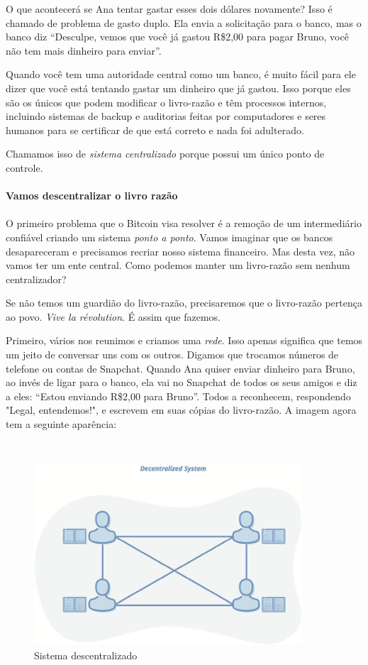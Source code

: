 O que acontecerá se Ana tentar gastar esses dois dólares novamente? Isso é chamado de problema de gasto duplo. Ela envia a solicitação para o banco, mas o banco diz “Desculpe, vemos que você já gastou R\$2,00 para pagar Bruno, você não tem mais dinheiro para enviar”.

Quando você tem uma autoridade central como um banco, é muito fácil para ele dizer que você está tentando gastar um dinheiro que já gastou. Isso porque eles são os únicos que podem modificar o livro-razão e têm processos internos, incluindo sistemas de backup e auditorias feitas por computadores e seres humanos para se certificar de que está correto e nada foi adulterado.

Chamamos isso de \textit{sistema centralizado} porque possui um único ponto de controle.

\paragraph{Vamos descentralizar o livro razão}
\paragraph{}

O primeiro problema que o Bitcoin visa resolver é a remoção de um intermediário confiável criando um sistema \textit{ponto a ponto}. Vamos imaginar que os bancos desapareceram e precisamos recriar nosso sistema financeiro. Mas desta vez, não vamos ter um ente central. Como podemos manter um livro-razão sem nenhum centralizador?

Se não temos um guardião do livro-razão, precisaremos que o livro-razão pertença ao povo. \textit{Vive la révolution}. É assim que fazemos.

Primeiro, vários nos reunimos e criamos uma \textit{rede}. Isso apenas significa que temos um jeito de conversar uns com os outros. Digamos que trocamos números de telefone ou contas de Snapchat. Quando Ana quiser enviar dinheiro para Bruno, ao invés de ligar para o banco, ela vai no Snapchat de todos os seus amigos e diz a eles: “Estou enviando R\$2,00 para Bruno”. Todos a reconhecem, respondendo "Legal, entendemos!", e escrevem em suas cópias do livro-razão. A imagem agora tem a seguinte aparência:

~

\begin{figure}
  \centering
  \includegraphics[width=10cm]{imagens/descentralizado-capitulo-02.jpg}
  \caption{Sistema descentralizado}
\end{figure}
\newpage

